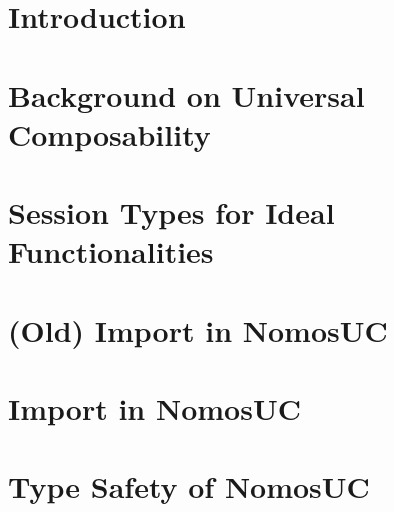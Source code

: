 \documentclass[acmsmall,screen,review,anonymous]{acmart}
\begin{document}
\maketitle



\section{Introduction} \label{sec:intro}


\section{Background on Universal Composability} \label{sec:background}


\section{Session Types for Ideal Functionalities} \label{sec:comexample}


%

\section{(Old) Import in NomosUC} \label{sec:oldmotivate}


\section{Import in NomosUC} \label{sec:motivate}


%
%
%

\section{Type Safety of NomosUC} \label{sec:safety}

\end{document}
